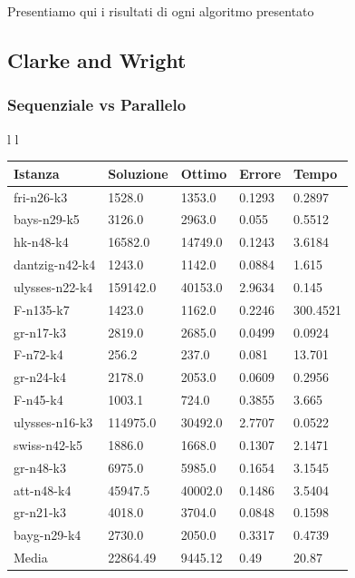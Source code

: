 \documentclass[]{article}
\begin{document}
Presentiamo qui i risultati di ogni algoritmo presentato 
\subsection{Clarke and Wright}
\subsubsection{Sequenziale vs Parallelo}

\begin{tabular}{l l}
\small
			\begin{tabular}{||l | l l l l||} 
				\hline
				Istanza & Soluzione & Ottimo & Errore & Tempo \\ [0.5ex] 
				\hline\hline
				fri-n26-k3 & 1528.0 & 1353.0 & 0.1293 & 0.2897  \\
				bays-n29-k5 & 3126.0 & 2963.0 & 0.055 & 0.5512  \\
				hk-n48-k4 & 16582.0 & 14749.0 & 0.1243 & 3.6184  \\
				dantzig-n42-k4 & 1243.0 & 1142.0 & 0.0884 & 1.615  \\
				\rowcolor{red}
				ulysses-n22-k4 &  \cellcolor{red} 159142.0 & 40153.0 & 2.9634 &  \cellcolor{red}  0.145  \\
				\rowcolor{white}
				F-n135-k7 & 1423.0 & 1162.0 & 0.2246 & \cellcolor{yellow} 300.4521  \\
				gr-n17-k3 & 2819.0 & 2685.0 & 0.0499 & 0.0924  \\
				F-n72-k4 & 256.2 & 237.0 & 0.081 & \cellcolor{yellow} 13.701  \\
				gr-n24-k4 & 2178.0 & 2053.0 & 0.0609 & 0.2956  \\
				F-n45-k4 & 1003.1 & 724.0 & 0.3855 & 3.665  \\
				\rowcolor{red}
				ulysses-n16-k3 &  \cellcolor{red} 114975.0 & 30492.0 & 2.7707 &  \cellcolor{red}  0.0522  \\
				\rowcolor{white}
				swiss-n42-k5 & 1886.0 & 1668.0 & 0.1307 & 2.1471  \\
				gr-n48-k3 & 6975.0 & 5985.0 & 0.1654 & 3.1545  \\
				att-n48-k4 & 45947.5 & 40002.0 & 0.1486 & 3.5404  \\
				gr-n21-k3 & 4018.0 & 3704.0 & 0.0848 & 0.1598  \\
				bayg-n29-k4 & 2730.0 & 2050.0 & 0.3317 & 0.4739  \\
				\hline
				Media & 22864.49 & 9445.12 & 0.49 & 20.87  \\			
				[1ex] 
				\hline
			\end{tabular}


\end{tabular}
\end{document}
